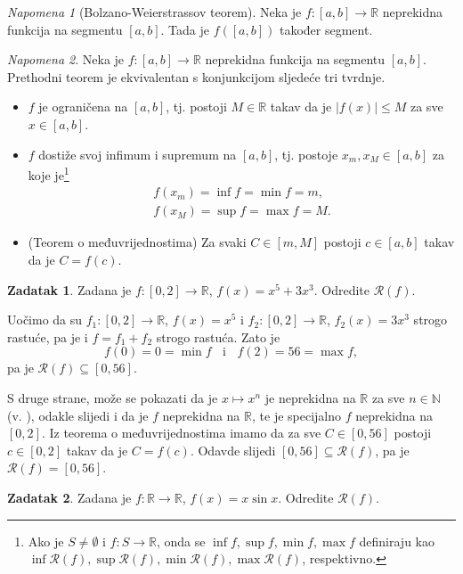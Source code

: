\documentclass{book}
\renewenvironment{proof}{%
    \vspace{-\parskip}\begin{oldproof}%
    }{%
    \end{oldproof}%
}
\theoremstyle{definition}
\theoremstyle{definition}
\newtheorem{exercise}{Zadatak}
\theoremstyle{remark}
\newtheorem{remark}{Napomena}
\begin{document}
\begin{remark}[Bolzano-Weierstrassov teorem]
Neka je $f : [a, b]\to \mathbb{R}$ neprekidna funkcija na segmentu $[a, b]$. Tada je $f([a, b])$ također segment.
\end{remark}
\begin{remark}
Neka je $f : [a, b]\to \mathbb{R}$ neprekidna funkcija na segmentu $[a, b]$. Prethodni teorem je ekvivalentan s konjunkcijom sljedeće tri tvrdnje.
\begin{itemize}
\item $f$ je ograničena na $[a, b]$, tj. postoji $M\in \mathbb{R}$ takav da je $|f(x)|\leq M$ za sve $x\in [a, b]$.
\item $f$ dostiže svoj infimum i supremum na $[a, b]$, tj. postoje $x_m, x_M\in [a, b]$ za koje je\footnote{Ako je $S\neq \emptyset$ i $f : S\to \mathbb{R}$, onda se $\inf{f}, \sup{f}, \min{f}, \max{f}$ definiraju kao $\inf{\mathcal{R}(f)}, \sup{\mathcal{R}(f)}, \min{\mathcal{R}(f)}, \max{\mathcal{R}(f)}$, respektivno.} 
\begin{gather*}
f(x_m)=\inf{f}=\min{f}=m,\\
f(x_M)=\sup{f}=\max{f}=M.
\end{gather*}
\item (Teorem o međuvrijednostima) Za svaki $C\in [m, M]$ postoji $c\in [a, b]$ takav da je $C=f(c)$.
\end{itemize}
\end{remark}
\newpage
\begin{exercise}
\label{imgcont1}
Zadana je $f : [0, 2]\to \mathbb{R}$, $f(x)=x^5+3x^3$. Odredite $\mathcal{R}(f)$.
\end{exercise}
\begin{proof}[Rješenje]
Uočimo da su $f_1 : [0, 2]\to \mathbb{R}$, $f(x)=x^5$ i $f_2 : [0, 2]\to \mathbb{R}$, $f_2(x)=3x^3$ strogo rastuće, pa je i $f=f_1+f_2$ strogo rastuća. Zato je $$f(0)=0=\min{f}\;\;\text{ i }\;\;f(2)=56=\max{f},$$
pa je $\mathcal{R}(f)\subseteq [0, 56]$.

S druge strane, može se pokazati da je $x\mapsto x^n$ je neprekidna na $\mathbb{R}$ za sve $n\in \mathbb{N}$ (v. \cite{3}), odakle slijedi i da je $f$ neprekidna na $\mathbb{R}$, te je specijalno $f$ neprekidna na $[0, 2]$. Iz teorema o međuvrijednostima imamo da za sve $C\in [0, 56]$ postoji $c\in [0, 2]$ takav da je $C=f(c)$. Odavde slijedi $[0, 56]\subseteq \mathcal{R}(f)$, pa je $\mathcal{R}(f)=[0, 56]$.
\end{proof}
\begin{exercise}
Zadana je $f : \mathbb{R}\to \mathbb{R}$, $f(x)=x\sin{x}$. Odredite $\mathcal{R}(f)$.
\end{exercise}
\end{document}
